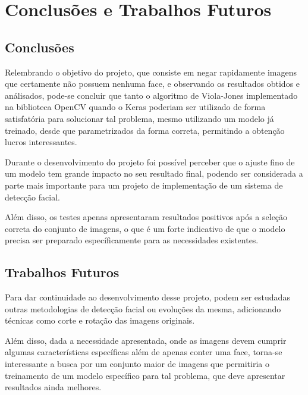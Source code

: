 \chapter{Conclusões e Trabalhos Futuros}\label{cap:conclusao}

\section{Conclusões}

Relembrando o objetivo do projeto, que consiste em negar rapidamente imagens que certamente não possuem nenhuma face, e observando os resultados obtidos e análisados, pode-se concluir que tanto o algoritmo de Viola-Jones implementado na biblioteca OpenCV quando o Keras poderiam ser utilizado de forma satisfatória para solucionar tal problema, mesmo utilizando um modelo já treinado, desde que parametrizados da forma correta, permitindo a obtenção lucros interessantes.

Durante o desenvolvimento do projeto foi possível perceber que o ajuste fino de um modelo tem grande impacto no seu resultado final, podendo ser considerada a parte mais importante para um projeto de implementação de um sistema de detecção facial.

Além disso, os testes apenas apresentaram resultados positivos após a seleção correta do conjunto de imagens, o que é um forte indicativo de que o modelo precisa ser preparado específicamente para as necessidades existentes.

\section{Trabalhos Futuros}

Para dar continuidade ao desenvolvimento desse projeto, podem ser estudadas outras metodologias de detecção facial ou evoluções da mesma, adicionando técnicas como corte e rotação das imagens originais.

Além disso, dada a necessidade apresentada, onde as imagens devem cumprir algumas características específicas além de apenas conter uma face, torna-se interessante a busca por um conjunto maior de imagens que permitiria o treinamento de um modelo específico para tal problema, que deve apresentar resultados ainda melhores.
